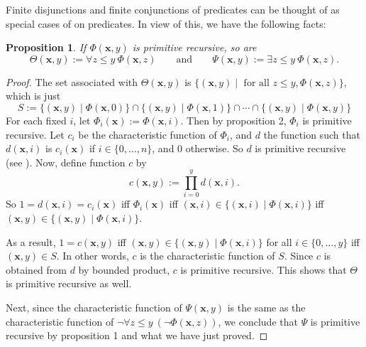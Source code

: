 \documentclass[12pt]{article}
\newtheorem{prop}{Proposition}
\begin{document}
Finite disjunctions and finite conjunctions of predicates can be thought of as special cases of  on predicates.  In view of this, we have the following facts:
\begin{prop}  If $\Phi(\boldsymbol{x},y)$ is primitive recursive, so are 
$$\Theta(\boldsymbol{x},y):= \forall z\le y \: \Phi(\boldsymbol{x},z) \qquad \mbox{and} \qquad \Psi(\boldsymbol{x},y):=\exists z\le y \: \Phi(\boldsymbol{x},z).$$
\end{prop}
\begin{proof}
The set associated with $\Theta(\boldsymbol{x},y)$ is $\lbrace (\boldsymbol{x},y)\mid \mbox{ for all }z\le y, \Phi(\boldsymbol{x},z)\rbrace$, which is just
$$S := \lbrace (\boldsymbol{x},y)\mid \Phi(\boldsymbol{x},0)\rbrace \cap \lbrace (\boldsymbol{x},y)\mid \Phi(\boldsymbol{x},1)\rbrace \cap \cdots \cap \lbrace (\boldsymbol{x},y)\mid \Phi(\boldsymbol{x},y)\rbrace $$
For each fixed $i$, let $\Phi_i(\boldsymbol{x}):=\Phi(\boldsymbol{x},i)$.  Then by proposition 2, $\Phi_i$ is primitive recursive.  Let $c_i$ be the characteristic function of $\Phi_i$, and $d$ the function such that $d(\boldsymbol{x},i)$ is $c_i(\boldsymbol{x})$ if $i\in \lbrace 0,\ldots, n\rbrace$, and $0$ otherwise.  So $d$ is primitive recursive (see ).  Now, define function $c$ by
$$c(\boldsymbol{x},y):=\prod_{i=0}^y d(\boldsymbol{x},i).$$
So $1=d(\boldsymbol{x},i)=c_i(\boldsymbol{x})$ iff $\Phi_i(\boldsymbol{x})$ iff $(\boldsymbol{x},i)\in \lbrace (\boldsymbol{x},i)\mid \Phi(\boldsymbol{x},i)\rbrace$ iff $(\boldsymbol{x},y)\in \lbrace (\boldsymbol{x},y)\mid \Phi(\boldsymbol{x},i)\rbrace$. 

As a result, $1=c(\boldsymbol{x},y)$ iff $(\boldsymbol{x},y)\in \lbrace (\boldsymbol{x},y)\mid \Phi(\boldsymbol{x},i)\rbrace$ for all $i\in \lbrace 0,\ldots, y\rbrace$ iff $(\boldsymbol{x},y)\in S$.  In other words, $c$ is the characteristic function of $S$.  Since $c$ is obtained from $d$ by bounded product, $c$ is primitive recursive.  This shows that $\Theta$ is primitive recursive as well.

Next, since the characteristic function of $\Psi(\boldsymbol{x},y)$ is the same as the characteristic function of $\neg \forall z\le y \: (\neg \Phi(\boldsymbol{x},z))$, we conclude that $\Psi$ is primitive recursive by proposition 1 and what we have just proved.
\end{proof}
\end{document}
